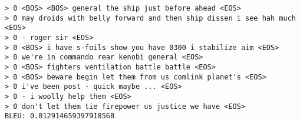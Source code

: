 \documentclass{article}
\begin{document}
\begin{verbatim}
> 0 <BOS> <BOS> general the ship just before ahead <EOS>
> 0 may droids with belly forward and then ship dissen i see hah much <EOS>
> 0 - roger sir <EOS>
> 0 <BOS> i have s-foils show you have 0300 i stabilize aim <EOS>
> 0 we're in commando rear kenobi general <EOS>
> 0 <BOS> fighters ventilation battle battle <EOS>
> 0 <BOS> beware begin let them from us comlink planet's <EOS>
> 0 i've been post - quick maybe ... <EOS>
> 0 - i woolly help them <EOS>
> 0 don't let them tie firepower us justice we have <EOS>
BLEU: 0.012914659397918568
\end{verbatim}
\end{document}
